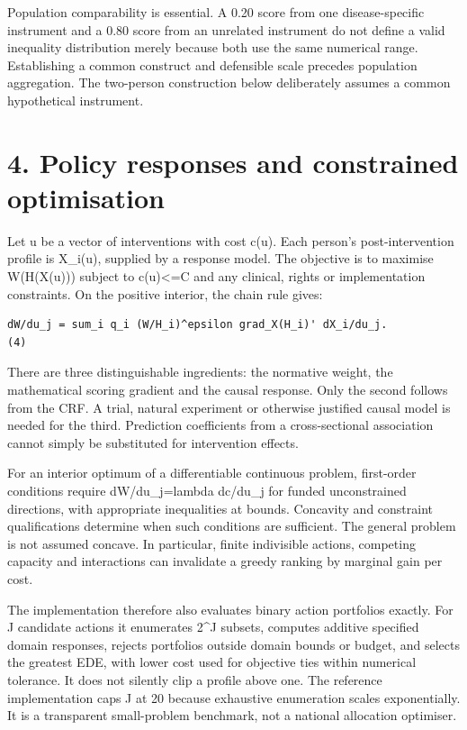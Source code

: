 \documentclass[11pt,a4paper]{article}
\begin{document}
Population comparability is essential. A 0.20 score from one disease-specific instrument and a 0.80 score from an unrelated instrument do not define a valid inequality distribution merely because both use the same numerical range. Establishing a common construct and defensible scale precedes population aggregation. The two-person construction below deliberately assumes a common hypothetical instrument.

\section*{4. Policy responses and constrained optimisation}
Let u be a vector of interventions with cost c(u). Each person's post-intervention profile is X\_i(u), supplied by a response model. The objective is to maximise W(H(X(u))) subject to c(u)\textless{}=C and any clinical, rights or implementation constraints. On the positive interior, the chain rule gives:

{\footnotesize\begin{verbatim}
dW/du_j = sum_i q_i (W/H_i)^epsilon grad_X(H_i)' dX_i/du_j.             (4)
\end{verbatim}}
There are three distinguishable ingredients: the normative weight, the mathematical scoring gradient and the causal response. Only the second follows from the CRF. A trial, natural experiment or otherwise justified causal model is needed for the third. Prediction coefficients from a cross-sectional association cannot simply be substituted for intervention effects.

For an interior optimum of a differentiable continuous problem, first-order conditions require dW/du\_j=lambda dc/du\_j for funded unconstrained directions, with appropriate inequalities at bounds. Concavity and constraint qualifications determine when such conditions are sufficient. The general problem is not assumed concave. In particular, finite indivisible actions, competing capacity and interactions can invalidate a greedy ranking by marginal gain per cost.

The implementation therefore also evaluates binary action portfolios exactly. For J candidate actions it enumerates 2\textasciicircum{}J subsets, computes additive specified domain responses, rejects portfolios outside domain bounds or budget, and selects the greatest EDE, with lower cost used for objective ties within numerical tolerance. It does not silently clip a profile above one. The reference implementation caps J at 20 because exhaustive enumeration scales exponentially. It is a transparent small-problem benchmark, not a national allocation optimiser.
\end{document}
